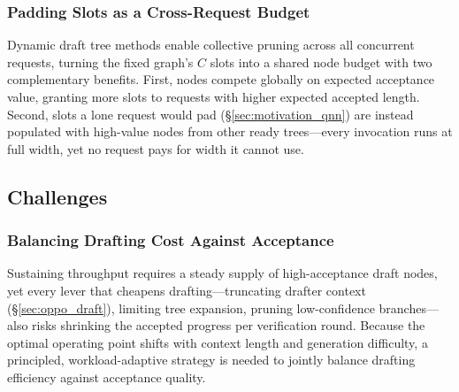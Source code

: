 \documentclass[sigconf,nonacm,10pt]{acmart}
\begin{document}

\subsubsection{Padding Slots as a Cross-Request Budget} \label{sec:oppo_padding}
Dynamic draft tree methods enable collective pruning across all concurrent requests, turning the fixed graph's $C$ slots into a shared node budget with two complementary benefits. First, nodes compete globally on expected acceptance value, granting more slots to requests with higher expected accepted length. Second, slots a lone request would pad (\S\ref{sec:motivation_qnn}) are instead populated with high-value nodes from other ready trees---every invocation runs at full width, yet no request pays for width it cannot use.

\subsection{Challenges}
\subsubsection{Balancing Drafting Cost Against Acceptance} \label{sec:challenge_draft}
Sustaining throughput requires a steady supply of high-acceptance draft nodes, yet every lever that cheapens drafting---truncating drafter context (\S\ref{sec:oppo_draft}), limiting tree expansion, pruning low-confidence branches---also risks shrinking the accepted progress per verification round. Because the optimal operating point shifts with context length and generation difficulty, a principled, workload-adaptive strategy is needed to jointly balance drafting efficiency against acceptance quality.
\end{document}
